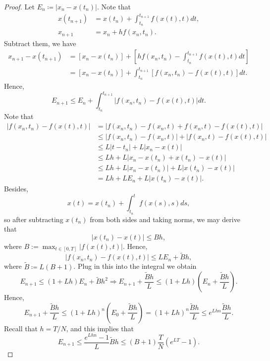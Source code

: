 \begin{proof}
Let $ E_n \coloneqq |x_n - x(t_n)|. $ Note that 
\begin{align*}
    x\left(t_{n+1}\right)&=x\left(t_n\right)+\int_{t_n}^{t_{n+1}} f(x(t), t) d t,\\  
    x_{n+1} &= x_n + h f(x_n,t_n). 
\end{align*}
Subtract them, we have 
\[
    \begin{aligned}
        x_{n+1}-x\left(t_{n+1}\right) & =\left[x_n-x\left(t_n\right)\right]+\left[h f\left(x_n, t_n\right)-\int_{t_n}^{t_{n+1}} f(x(t), t) d t\right] \\
        & =\left[x_n-x\left(t_n\right)\right]+\int_{t_n}^{t_{n+1}}\left[f\left(x_n, t_n\right)-f(x(t), t)\right] d t .
        \end{aligned} 
\]
Hence, 
\[
    E_{n+1} \leq E_n+\int_{t_n}^{t_{n+1}}\left|f\left(x_n, t_n\right)-f(x(t), t)\right| d t .
\]
Note that 
\[
    \begin{aligned}
        \left|f\left(x_n, t_n\right)-f(x(t), t)\right| & =\left|f\left(x_n, t_n\right)-f\left(x_n, t\right)+f\left(x_n, t\right)-f(x(t), t)\right| \\
        & \leq\left|f\left(x_n, t_n\right)-f\left(x_n, t\right)\right|+\left|f\left(x_n, t\right)-f(x(t), t)\right| \\
        & \leq L\left|t-t_n\right|+L\left|x_n-x(t)\right| \\
        & \leq L h+L\left|x_n-x\left(t_n\right)+x\left(t_n\right)-x(t)\right| \\
        & \leq L h+L\left|x_n-x\left(t_n\right)\right|+L\left|x\left(t_n\right)-x(t)\right| \\
        & =L h+L E_n+L\left|x\left(t_n\right)-x(t)\right| .
        \end{aligned} 
\]
Besides, 
\[
    x(t)=x\left(t_n\right)+\int_{t_n}^t f(x(s), s) d s,
\]
so after subtracting $x\left(t_n\right)$ from both sides and taking norms, we may derive that
$$
\left|x\left(t_n\right)-x(t)\right| \leq B h,
$$
where $B:=\max _{t \in[0, T]}|f(x(t), t)| .$ Hence, 
\[
    \left|f\left(x_n, t_n\right)-f(x(t), t)\right| \leq L E_n+\tilde{B} h,
\]
where $ \tilde B \coloneqq L(B+1) $.  Plug in this into the integral we obtain 
\[
    E_{n+1} \leq(1+L h) E_n+\tilde{B} h^2\Rightarrow E_{n+1} + \frac{\tilde Bh}{L} \le (1+Lh) \left (E_n + \frac{\tilde B h}{L}\right ). 
\]
Hence, 
\[
    E_{n+1} + \frac{\tilde Bh}{L} \le (1+Lh)^n \left (E_0 + \frac{\tilde B h}{L}\right) = (1+Lh)^n \frac{\tilde B h}{L} \le e^{Lhn}  \frac{\tilde B h}{L}. 
\]
Recall that $ h=T/N$,  and this implies that 
\[
    E_{n+1} \le  \frac{e^{Lhn}  -1 }{L} \tilde B h \le (B+1) \frac{T}{N}(e^{LT}-1). 
\]
\end{proof}


